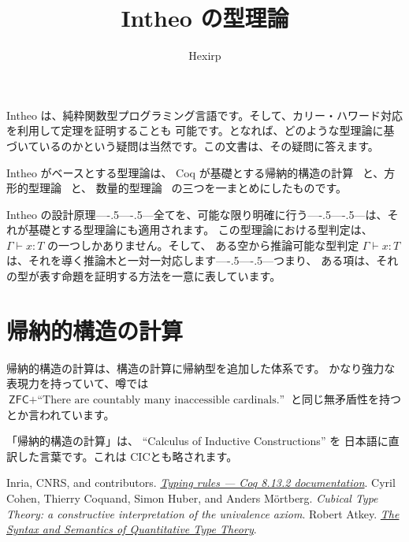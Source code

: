 \documentclass[book]{jlreq}
\title{Intheo の型理論}
\author{Hexirp}
\def\——{—\kern-.5\zw—\kern-.5\zw—}
\newcommand{\bidash}{\——}
\newcommand{\CIC}{\textsf{CIC}}
\begin{document}
\frontmatter

\maketitle

Intheo は、純粋関数型プログラミング言語です。そして、カリー・ハワード対応を利用して定理を証明することも
可能です。となれば、どのような型理論に基づいているのかという疑問は当然です。この文書は、その疑問に答えます。

Intheo がベースとする型理論は、 Coq が基礎とする帰納的構造の計算~\cite{cic} と、方形的型理論~\cite{cutt} と、
数量的型理論~\cite{qtt} の三つを一まとめにしたものです。

Intheo の設計原理\bidash{}全てを、可能な限り明確に行う\bidash{}は、それが基礎とする型理論にも適用されます。
この型理論における型判定は、 \( Γ \vdash x : T \) の一つしかありません。そして、
ある空から推論可能な型判定 \( Γ \vdash x : T \) は、それを導く推論木と一対一対応します\bidash{}つまり、
ある項は、それの型が表す命題を証明する方法を一意に表しています。

\tableofcontents

\mainmatter

\part{帰納的構造の計算}

帰納的構造の計算は、構造の計算に帰納型を追加した体系です。
かなり強力な表現力を持っていて、噂では \( \textsf{ZFC} + \textrm{``There are countably many inaccessible
cardinals.''} \) と同じ無矛盾性を持つとか言われています。

「帰納的構造の計算」は、 ``Calculus of Inductive Constructions'' を
日本語に直訳した言葉です。これは \index{CIC@\CIC}\CIC とも略されます。

\backmatter

\begin{thebibliography}{99}
    Inria, CNRS, and contributors.
    \href{https://coq.github.io/doc/v8.13/refman/language/cic.html}{\textit{Typing rules --- Coq 8.13.2 documentation}}.
    Cyril Cohen, Thierry Coquand, Simon Huber, and Anders Mörtberg.
    \textit{Cubical Type Theory: a constructive interpretation of the univalence axiom}.
    Robert Atkey.
    \href{https://bentnib.org/quantitative-type-theory.html}{\textit{The Syntax and Semantics of Quantitative Type Theory}}.
\end{thebibliography}

\printindex
\end{document}
